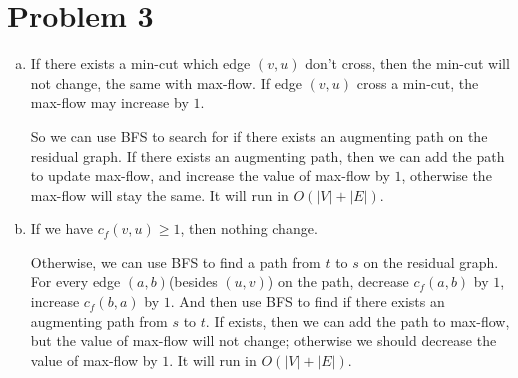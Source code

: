 \documentclass{article}
\begin{document}
\begin{center}
\end{center}
\pagebreak
\section*{Problem 3}
\begin{enumerate}[(a)]
    \item 
    If there exists a min-cut which edge $(v,u)$ don't cross, then the min-cut will not change, the same with max-flow.
    If edge $(v,u)$ cross a min-cut, the max-flow may increase by $1$.
    
    So we can use BFS to search for if there exists an augmenting path on the residual graph. 
    If there exists an augmenting path, then we can add the path to update max-flow, and increase the value of max-flow by $1$, otherwise the max-flow will stay the same. It will run in $O(|V|+|E|)$.

    \item 
    If we have $c_f(v,u)\geqslant 1$, then nothing change.

    Otherwise, we can use BFS to find a path from $t$ to $s$ on the residual graph. 
    For every edge $(a,b)$(besides $(u,v)$) on the path, decrease $c_f(a,b)$ by $1$, increase $c_f(b,a)$ by $1$.
    And then use BFS to find if there exists an augmenting path from $s$ to $t$.
    If exists, then we can add the path to max-flow, but the value of max-flow will not change; otherwise we should decrease the value of max-flow by $1$.
    It will run in $O(|V|+|E|)$.

\end{enumerate}
\end{document}
